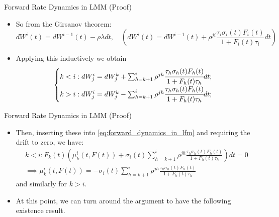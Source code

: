 \documentclass{beamer}
\begin{document}
\begin{frame}{Forward Rate Dynamics in LMM (Proof)}
  \begin{itemize}
  \item<1-> So from the Girsanov theorem:
    \begin{equation*}
      dW^i(t) = dW^{i-1}(t)-\rho\lambda dt,\quad \left(dW^i(t) = dW^{i-1}(t)+\rho^{ji}\frac{\tau_i\sigma_i(t)F_i(t)}{1+F_i(t)\tau_i} dt\right)
    \end{equation*}
  \item<2-> Applying this inductively we obtain
    \begin{equation*}
  	\begin{cases}
	k < i : dW^i_j = dW^k_j + \sum_{h=k+1}^i \rho^{jh}\cfrac{\tau_h\sigma_h(t)F_h(t)}{1+F_h(t)\tau_h} dt;\\
	k > i : dW^i_j = dW^k_j - \sum_{h=k+1}^i \rho^{jh}\cfrac{\tau_h\sigma_h(t)F_h(t)}{1+F_h(t)\tau_h} dt;\\
  	\end{cases}
    \end{equation*}
  \end{itemize}
\end{frame}

\begin{frame}{Forward Rate Dynamics in LMM (Proof)}
	\begin{itemize}
	\item<1-> Then, inserting these into \cref{eq:forward_dynamics_in_lfm} and requiring the drift to zero, we have:
		\begin{equation*}
			\begin{gathered}
				k < i : F_k(t)\left( \mu_k^i(t, F(t)) + \sigma_i(t)\sum_{h=k+1}^i \rho^{jh} \frac{\tau_h\sigma_h(t)F_h(t)}{1+F_h(t)\tau_h}\right) dt = 0 \\
				\implies \mu_k^i(t, F(t)) = - \sigma_i(t)\sum_{h=k+1}^i \rho^{jh} \frac{\tau_h\sigma_h(t)F_h(t)}{1+F_h(t)\tau_h}
			\end{gathered}
		\end{equation*}
		and similarly for $k > i$.
	\item<2-> At this point, we can turn around the argument to have the following existence result.
	\end{itemize}
\end{frame}
\end{document}
